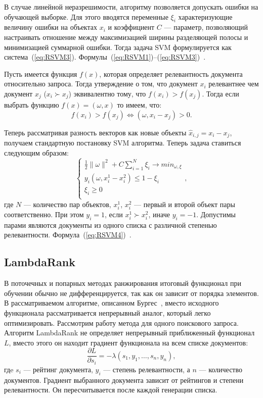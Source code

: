 В случае линейной неразрешимости, алгоритму позволяется допускать ошибки на обучающей выборке. Для этого вводятся переменные $\xi_{i}$ характеризующие величину ошибки на объектах $x_i$ и коэффициент $C$ --- параметр, позволяющий настраивать отношение между максимизацией ширины разделяющей полосы и минимизацией суммарной ошибки. Тогда задача SVM формулируется как система~(\ref{eq:RSVM3}). Формулы~(\ref{eq:RSVM1})--(\ref{eq:RSVM3})~\cite{ML_no_wors}.

Пусть имеется функция $f(x)$, которая определяет релевантность документа относительно запроса. Тогда утверждение о том, что документ $x_{i}$ релевантнее чем документ $x_{j}$  ($x_{i} \succ x_{j}$)  эквивалентно тому, что $f(x_{i}) > f(x_{j})$. Тогда если выбрать функцию $f(x)=(\omega, x)$ то имеем, что:
\[
	f(x_{i}) > f(x_{j}) \iff (\omega, x_{i} - x_{j}) > 0.
\]

Теперь рассматривая разность векторов как новые объекты $\hat{x}_{i, j} = x_{i} - x_{j}$, получаем стандартную постановку SVM алгоритма. Теперь задача ставиться следующим образом:
\begin{equation}
\begin{cases}
	\label{eq:RSVM4}
	\frac{1}{2}\| \omega \|^2+C  \displaystyle\sum_{i=1}^{N} \xi_{i}\to min_{\omega, \xi} \\
	y_{i}(\omega, x_{i}^1 - x_{i}^2) \leq 1 - \xi_{i} \\
	\xi_{i} \geq 0 \\
\end{cases},
\end{equation}
где $N$ --- количество пар объектов, $x_{i}^1$, $x_{i}^2$ --- первый и второй объект пары соответственно. При этом $y_{i} = 1$, если $x_{i}^1 \succ x_{i}^2$, иначе  $y_{i} = -1$. Допустимы парами являются документы из одного списка  с различной степенью релевантности. Формула~(\ref{eq:RSVM4})~\cite{RankSVM}.

\subsection{LambdaRank}

В поточечных и попарных методах ранжирования итоговый функционал при обучении обычно не дифференцируется, так как он зависит от порядка элементов. В рассматриваемом алгоритме, описанном Бургес~\cite{LamdaRank}, вместо исходного функционала рассматривается непрерывный аналог, который легко оптимизировать.
Рассмотрим работу метода для одного поискового запроса. Алгоритм LambdaRank не определяет непрерывный приближенный функционал $L$, вместо этого он находит градиент функционала на всем списке документов:
\begin{equation}
	\label{eq:LBR1}
	\frac{\partial L}{\partial s_{i}} = -\lambda(s_{1}, y_{1}, \dots, s_{n}, y_{n}),
\end{equation}
гдe $s_{i}$ --- рейтинг документа, $y_{i}$ --- степень релевантности, а $n$ --- количество документов. Градиент выбранного документа зависит от рейтингов и степени релевантности. Он пересчитывается после каждой генерации списка.

